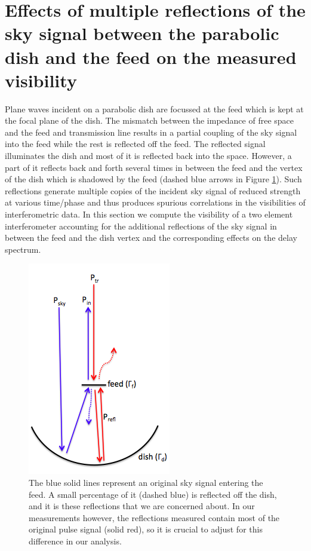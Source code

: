 \documentclass[12pt,preprint]{aastex}
\begin{document}
\section{Effects of multiple reflections of the sky signal between the parabolic dish and the feed on the measured visibility}
 Plane waves incident on a parabolic dish are focussed at the feed which is kept at the focal plane of the dish. The mismatch between the impedance of free space and the feed and transmission line results in a partial coupling of the sky signal into the feed while the rest is reflected off the feed. The reflected signal illuminates the dish and most of it is reflected back into the space. However, a part of it reflects back and forth several times in between the feed and the vertex of the dish which is shadowed by the feed (dashed blue arrows in Figure \ref{fig:cartoon}). Such reflections generate multiple copies of the incident sky signal of reduced strength at various time/phase and thus produces spurious correlations in the visibilities of interferometric data. In this section we compute the visibility of a two element interferometer accounting for the additional reflections of the sky signal in between the feed and the dish vertex and the corresponding effects on the delay spectrum. 

\begin{figure}[ht!]
\centering
\includegraphics[totalheight=0.35\textheight]{plots/reflection_cartoon.png}
\caption{The blue solid lines represent an original sky signal entering the
feed. A small percentage of it (dashed blue) is reflected off the dish, and it
is these reflections that we are concerned about. In our measurements however,
the reflections measured contain most of the original pulse signal (solid red),
so it is crucial to adjust for this difference in our analysis.}
\label{fig:cartoon}
\end{figure}
\end{document}
